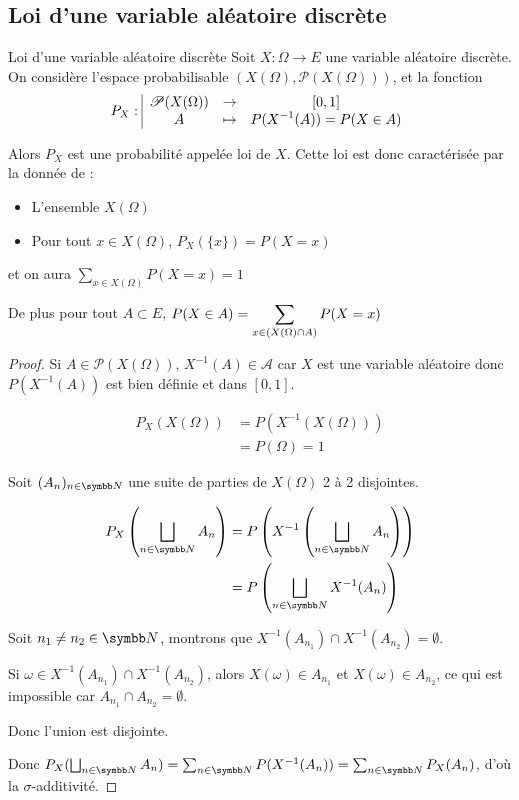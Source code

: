 \subsection{Loi d'une variable aléatoire discrète }

\begin{theoreme}{Loi d'une variable aléatoire discrète}{}
    Soit $X : \Omega \to E$ une variable aléatoire discrète. On considère l'espace probabilisable 
    $(X(\Omega), \mathscr P(X(\Omega)))$, et la fonction 
    $$P_X: \space \begin{array}{|ccc} \displaystyle \mathscr P(X(\Omega)) & \to & \displaystyle [0, 1] \\ \displaystyle A & \mapsto & \displaystyle P(X^{-1}(A)) = P(X \in A) \end{array}$$

    Alors $P_X$ est une probabilité appelée loi de $X$. Cette loi est donc caractérisée par la donnée de : 
    \begin{itemize}
        \item L'ensemble $X(\Omega)$
        \item Pour tout $x \in X(\Omega)$, $P_X(\{x\}) = P(X = x)$
    \end{itemize}
    et on aura $\sum_{x \in X(\Omega)} P(X = x) = 1$

    De plus pour tout $A \subset E$, $\displaystyle P(X \in A) = \sum_{x \in (X(\Omega) \cap A)} P(X = x)$
\end{theoreme}

\begin{proof}
    Si $A \in \mathscr P(X(\Omega))$, $X^{-1}(A) \in \mathcal A$ car $X$ est une variable aléatoire
    donc $P(X^{-1}(A))$ est bien définie et dans $[0, 1]$.

    \begin{align}
        P_X(X(\Omega)) & = P(X^{-1}(X(\Omega))) \\
        & = P(\Omega) = 1
    \end{align}


    \svspace Soit $(A_n)_{n \in \N}$ une suite de parties de $X(\Omega)$ 2 à 2 disjointes.

    \begin{align}
        P_X \left( \bigsqcup_{n \in \N} A_n \right) & = P\left( X^{-1}\left( \bigsqcup_{n \in \N} A_n \right) \right) \\
        & = P\left( \bigsqcup_{n \in \N} X^{-1}(A_n) \right) 
    \end{align}

    Soit $n_1 \neq n_2 \in \N$, montrons que $X^{-1}(A_{n_1}) \cap X^{-1}(A_{n_2}) = \emptyset$.

    Si $\omega \in X^{-1}(A_{n_1}) \cap X^{-1}(A_{n_2})$, alors $X(\omega) \in A_{n_1}$ et $X(\omega) \in A_{n_2}$,
    ce qui est impossible car $A_{n_1} \cap A_{n_2} = \emptyset$.

    Donc l'union est disjointe. 

    Donc $P_X(\bigsqcup_{n \in \N} A_n) = \sum_{n \in \N} P(X^{-1}(A_n)) = \sum_{n \in \N} P_X(A_n)$, 
    d'où la $\sigma$-additivité.

\end{proof}

